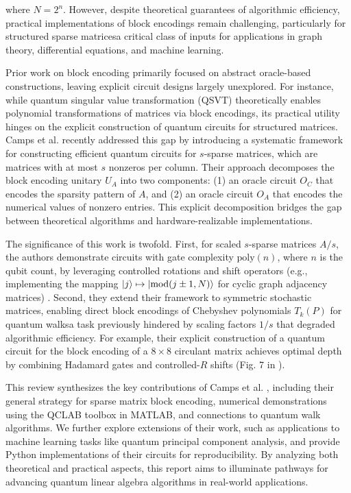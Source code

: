 \documentclass{article}
\begin{document}
    where $N=2^n$. However, despite theoretical guarantees of algorithmic efficiency, practical implementations of block encodings remain challenging, particularly for structured sparse matrices\textemdash a critical class of inputs for applications in graph theory, differential equations, and machine learning.

    Prior work on block encoding primarily focused on abstract oracle-based constructions, leaving explicit circuit designs largely unexplored. For instance, while quantum singular value transformation (QSVT) \cite{Gilyen2019} theoretically enables polynomial transformations of matrices via block encodings, its practical utility hinges on the explicit construction of quantum circuits for structured matrices. Camps et al. \cite{EQC} recently addressed this gap by introducing a systematic framework for constructing efficient quantum circuits for $s$-sparse matrices, which are matrices with at most $s$ nonzeros per column. Their approach decomposes the block encoding unitary $U_A$ into two components: (1) an oracle circuit $O_C$ that encodes the sparsity pattern of $A$, and (2) an oracle circuit $O_A$ that encodes the numerical values of nonzero entries. This explicit decomposition bridges the gap between theoretical algorithms and hardware-realizable implementations.

    The significance of this work is twofold. First, for scaled $s$-sparse matrices $A/s$, the authors demonstrate circuits with gate complexity $\text{poly}(n)$, where $n$ is the qubit count, by leveraging controlled rotations and shift operators (e.g., implementing the mapping $\ket{j} \mapsto \ket{\text{mod}(j \pm 1, N)}$ for cyclic graph adjacency matrices) \cite{EQC}. Second, they extend their framework to symmetric stochastic matrices, enabling direct block encodings of Chebyshev polynomials $T_k(P)$ for quantum walks\textemdash a task previously hindered by scaling factors $1/s$ that degraded algorithmic efficiency. For example, their explicit construction of a quantum circuit for the block encoding of a $8 \times 8$ circulant matrix achieves optimal depth by combining Hadamard gates and controlled-$R$ shifts (Fig. 7 in \cite{EQC}).

    This review synthesizes the key contributions of Camps et al. \cite{EQC}, including their general strategy for sparse matrix block encoding, numerical demonstrations using the QCLAB toolbox in MATLAB, and connections to quantum walk algorithms. We further explore extensions of their work, such as applications to machine learning tasks like quantum principal component analysis, and provide Python implementations of their circuits for reproducibility. By analyzing both theoretical and practical aspects, this report aims to illuminate pathways for advancing quantum linear algebra algorithms in real-world applications.
\end{document}
